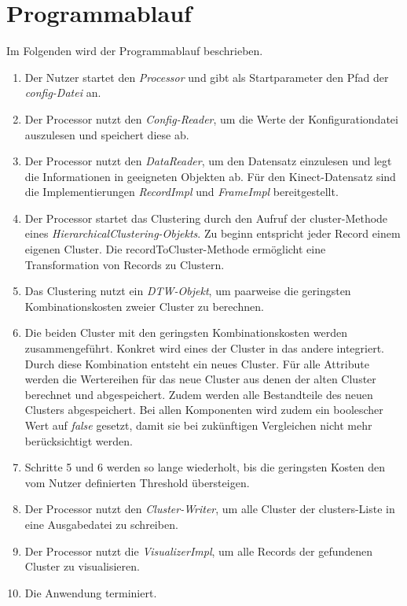 \section{Programmablauf}
\label{4-Programmablauf}
Im Folgenden wird der Programmablauf beschrieben.
\begin{enumerate}
    \item Der Nutzer startet den \emph{Processor}
    und gibt als Startparameter den Pfad der \emph{config-Datei} an.
    \item Der Processor nutzt den \emph{Config-Reader}, um die Werte der Konfigurationdatei auszulesen
    und speichert diese ab.
    \item Der Processor nutzt den \emph{DataReader}, um den Datensatz einzulesen
    und legt die Informationen in geeigneten Objekten ab.
    Für den Kinect-Datensatz sind die Implementierungen \emph{RecordImpl} und \emph{FrameImpl}
    bereitgestellt.
    \item Der Processor startet das Clustering durch den Aufruf der cluster-Methode
    eines \emph{HierarchicalClustering-Objekts}.
    Zu beginn entspricht jeder Record einem eigenen Cluster.
    Die recordToCluster-Methode ermöglicht eine Transformation von Records zu Clustern.
    \item Das Clustering nutzt ein \emph{\ac{DTW}-Objekt},
    um paarweise die geringsten Kombinationskosten zweier Cluster zu berechnen.
    \item Die beiden Cluster mit den geringsten Kombinationskosten werden zusammengeführt.
    Konkret wird eines der Cluster in das andere integriert.
    Durch diese Kombination entsteht ein neues Cluster.
    Für alle Attribute werden die Wertereihen für das neue Cluster aus denen der alten Cluster berechnet und abgespeichert.
    Zudem werden alle Bestandteile des neuen Clusters abgespeichert.
    Bei allen Komponenten wird zudem ein boolescher Wert auf \emph{false} gesetzt,
    damit sie bei zukünftigen Vergleichen nicht mehr berücksichtigt werden.
    \item Schritte 5 und 6 werden so lange wiederholt, bis die geringsten Kosten den vom Nutzer definierten Threshold übersteigen.
    \item Der Processor nutzt den \emph{Cluster-Writer}, um alle Cluster der clusters-Liste
    in eine Ausgabedatei zu schreiben.
    \item Der Processor nutzt die \emph{VisualizerImpl}, um alle Records der gefundenen Cluster zu visualisieren.
    \item Die Anwendung terminiert. 
\end{enumerate}
